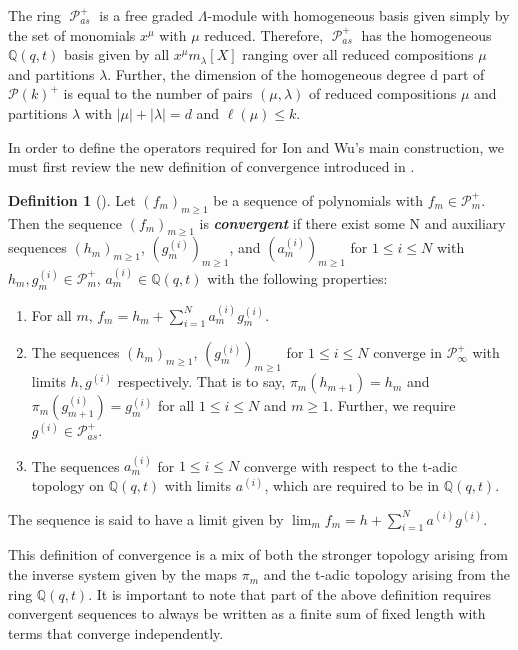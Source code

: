 \documentclass[11pt]{article}
\theoremstyle{definition}
\newtheorem{defi}[theo]{Definition}
\numberwithin{equation}{section}
\DeclareMathOperator{\sP}{\mathscr{P} }
\begin{document}
The ring $\sP_{as}^{+}$ is a free graded $\Lambda$-module with homogeneous basis given simply by the set of monomials $x^{\mu}$ with $\mu$ reduced. Therefore, $\sP_{as}^{+}$ has the homogeneous $\mathbb{Q}(q,t)$ basis given by all $x^{\mu}m_{\lambda}[X]$ ranging over all reduced compositions $\mu$ and partitions $\lambda$. Further, the dimension of the homogeneous degree d part of $\mathscr{P}(k)^{+}$ is equal to the number of pairs $(\mu,\lambda)$ of reduced compositions $\mu$ and partitions $\lambda$ with $|\mu|+|\lambda| = d$ and $\ell(\mu) \leq k$. 
 
In order to define the operators required for Ion and Wu's main construction, we must first review the new definition of convergence introduced in \cite{Ion_2022}. 

 \begin{defi}[\cite{Ion_2022}]\label{defn6}
 Let $(f_m)_{m \geq 1}$ be a sequence of polynomials with $f_m \in \mathscr{P}_m^{+}$. Then the sequence $(f_m)_{m \geq 1}$ is \textbf{\textit{convergent}} if there exist some N and auxiliary sequences $(h_m)_{m\geq1}$, $(g^{(i)}_m)_{m\geq 1}$, and $(a^{(i)}_m)_{m\geq 1}$ for $1\leq i \leq N$ with $h_m, g^{(i)}_m \in \mathscr{P}_{m}^{+}$, $a^{(i)}_m \in \mathbb{Q}(q,t)$ with the following properties:

\begin{enumerate}
    \item For all $m$, $f_m = h_m + \sum_{i=1}^{N} a^{(i)}_m g^{(i)}_m$.
    \item The sequences $(h_m)_{m\geq1}$, $(g^{(i)}_m)_{m\geq1}$ for $1\leq i \leq N$ converge in $\mathscr{P}_{\infty}^{+}$ with limits $h,g^{(i)}$ respectively. That is to say, $\pi_m(h_{m+1}) = h_m$ and $\pi_m(g_{m+1}^{(i)}) = g_{m}^{(i)}$ for all $1\leq i \leq N$ and $m \geq 1$. Further, we require $g^{(i)} \in \mathscr{P}_{as}^{+}$.
    \item The sequences $a^{(i)}_m$ for $1\leq i \leq N$ converge with respect to the t-adic topology on $\mathbb{Q}(q,t)$ with limits $a^{(i)}$, which are required to be in $\mathbb{Q}(q,t)$.
\end{enumerate}

The sequence is said to have a limit given by
$\lim_{m} f_m = h + \sum_{i=1}^{N}a^{(i)}g^{(i)}.$

\end{defi}

This definition of convergence is a mix of both the stronger topology arising from the inverse system given by the maps $\pi_m$ and the t-adic topology arising from the ring $\mathbb{Q}(q,t)$. It is important to note that part of the above definition requires convergent sequences to always be written as a finite sum of fixed length with terms that converge independently. 
\end{document}
